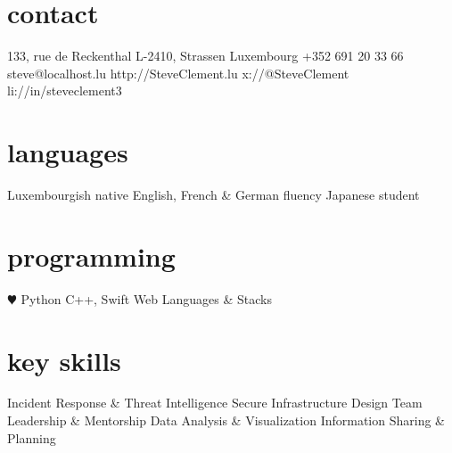 \documentclass[]{friggeri-cv} %
\begin{document}


\begin{aside} %
\section{contact}
133, rue de Reckenthal
L-2410, Strassen
Luxembourg
+352 691 20 33 66
{steve@localhost.lu}
{http://SteveClement.lu}
{x://@SteveClement}
{li://in/steveclement3}
\section{languages}
Luxembourgish native
English, French \& German fluency
Japanese student
\section{programming}
{\color{red} $\varheartsuit$} Python
C++, Swift
Web Languages \& Stacks
\section{key skills}
Incident Response \& Threat Intelligence
Secure Infrastructure Design
Team Leadership \& Mentorship
Data Analysis \& Visualization
Information Sharing \& Planning
\end{aside}

\end{document}

